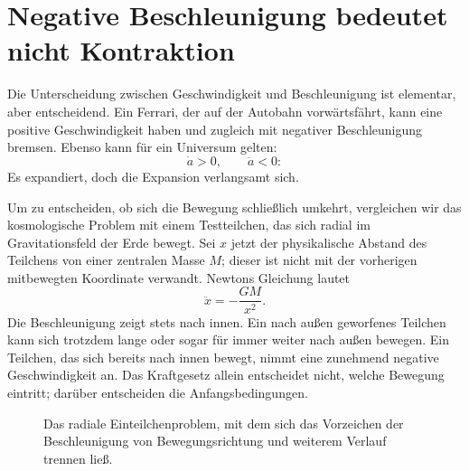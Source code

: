 \section{Negative Beschleunigung bedeutet nicht Kontraktion}

Die Unterscheidung zwischen Geschwindigkeit und Beschleunigung ist elementar, aber entscheidend. Ein Ferrari, der auf der Autobahn vorwärtsfährt, kann eine positive Geschwindigkeit haben und zugleich mit negativer Beschleunigung bremsen. Ebenso kann für ein Universum gelten:
\begin{equation}
\dot a>0,
\qquad
\ddot a<0:
\end{equation}
Es expandiert, doch die Expansion verlangsamt sich.

Um zu entscheiden, ob sich die Bewegung schließlich umkehrt, vergleichen wir das kosmologische Problem mit einem Testteilchen, das sich radial im Gravitationsfeld der Erde bewegt. Sei \(x\) jetzt der physikalische Abstand des Teilchens von einer zentralen Masse \(M\); dieser ist nicht mit der vorherigen mitbewegten Koordinate verwandt. Newtons Gleichung lautet
\begin{equation}
\ddot x=-\frac{GM}{x^2}.
\label{eq:c01-particle-force}
\end{equation}
Die Beschleunigung zeigt stets nach innen. Ein nach außen geworfenes Teilchen kann sich trotzdem lange oder sogar für immer weiter nach außen bewegen. Ein Teilchen, das sich bereits nach innen bewegt, nimmt eine zunehmend negative Geschwindigkeit an. Das Kraftgesetz allein entscheidet nicht, welche Bewegung eintritt; darüber entscheiden die Anfangsbedingungen.

\begin{classroomqa}
\end{classroomqa}

\begin{figure}[ht]\centering
{}\caption{Das radiale Einteilchenproblem, mit dem sich das Vorzeichen der Beschleunigung von Bewegungsrichtung und weiterem Verlauf trennen ließ.}\label{fig:c01-particle-sketch}\end{figure}

